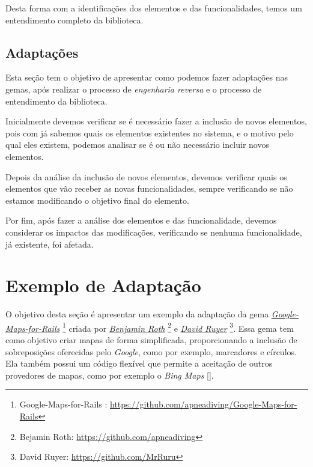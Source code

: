 Desta forma com a identificações dos elementos e das funcionalidades, temos um entendimento completo da
biblioteca.


\subsection{Adaptações}
\label{subsection:adaptações}


Esta seção tem o objetivo de apresentar como podemos fazer adaptações nas gemas, após realizar o
processo de \emph{engenharia reversa} e o processo de entendimento da biblioteca.

Inicialmente devemos verificar se é necessário fazer a inclusão de novos elementos, pois com já sabemos
quais os elementos existentes no sistema, e o motivo pelo qual eles existem, podemos analisar se é ou não
necessário incluir novos elementos.

Depois da análise da inclusão de novos elementos, devemos verificar quais os elementos que vão receber
as novas funcionalidades, sempre verificando se não estamos modificando o objetivo final do elemento.

Por fim, após fazer a análise dos elementos e das funcionalidade, devemos considerar os impactos das modificações,
verificando se nenhuma funcionalidade, já existente, foi afetada.


\section{Exemplo de Adaptação}
\label{section:exemplo_de_adaptação}


O objetivo desta seção é apresentar um exemplo da adaptação da gema
\emph{\href{https://github.com/apneadiving/Google-Maps-for-Rails}{Google-Maps-for-Rails}}
\footnote{Google-Maps-for-Rails : \url{https://github.com/apneadiving/Google-Maps-for-Rails}} criada por
\emph{\href{https://github.com/apneadiving}{Benjamin Roth}}
\footnote{Bejamin Roth: \url{https://github.com/apneadiving}} e
\emph{\href{https://github.com/MrRuru}{David Ruyer}} \footnote{David Ruyer: \url{https://github.com/MrRuru}}.
Essa gema tem como objetivo criar mapas de forma simplificada, proporcionando a inclusão de
sobreposições oferecidas pelo \emph{Google}, como por exemplo, marcadores e círculos. Ela também possui
um código flexível que permite a aceitação de outros provedores de mapas, como por exemplo o
\emph{Bing Maps} [].

